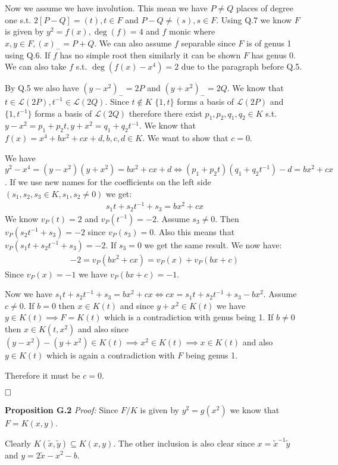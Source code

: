 \documentclass[12pt, a4paper]{article}
\newcommand{\qed}{\hfill\square}
\begin{document}
Now we assume we have involution. This mean we have $P \neq Q$ places of degree one s.t. $2[P-Q]=(t), t \in F$ and $P-Q \neq (s), s \in F$. Using Q.7 we know $F$ is given by $y^2 = f(x), \deg(f)=4$ and $f$ monic where $x,y \in F, (x)_{-} = P+Q$. We can also assume $f$ separable since $F$ is of genus 1 using Q.6. If $f$ has no simple root then similarly it can be shown $F$ has genus 0. We can also take $f$ s.t. $\deg(f(x)-x^4)=2$ due to the paragraph before Q.5.

By Q.5 we also have $(y-x^2)_{-} = 2P$ and $(y+x^2)_{-} = 2Q$. We know that $t \in \mathcal{L}(2P), t^{-1} \in \mathcal{L}(2Q)$. Since $t \notin K$ $\{1,t\}$ forms a basis of $\mathcal{L}(2P)$ and $\{1,t^{-1}\}$ forms a basis of $\mathcal{L}(2Q)$ therefore there exist $p_1, p_2, q_1, q_2 \in K$ s.t. $y-x^2 = p_1+p_2t, y+x^2=q_1+q_2t^{-1}$. We know that $f(x)=x^4+bx^2+cx+d, b,c,d \in K$. We want to show that $c=0$. 

We have $y^2-x^4=(y-x^2)(y+x^2)=bx^2+cx+d \iff (p_1+p_2t)(q_1+q_2t^{-1})-d = bx^2+cx$. If we use new names for the coefficients on the left side $(s_1,s_2,s_3 \in K, s_1,s_2 \neq 0)$
 we get:
\begin{gather*}
s_1t+s_2t^{-1}+s_3 = bx^2+cx
\end{gather*}
We know $v_P(t)=2$ and $v_P(t^{-1})=-2$. Assume $s_3 \neq 0$. Then $v_P(s_2t^{-1}+s_3) = -2$ since $v_P(s_3) = 0$. Also this means that $v_P(s_1t+s_2t^{-1}+s_3)=-2$. If $s_3=0$ we get the same result. We now have:
\begin{gather*}
-2=v_P(bx^2+cx) = v_P(x)+v_P(bx+c)
\end{gather*}
Since $v_P(x)=-1$ we have $v_P(bx+c) = -1$.

Now we have $s_1t+s_2t^{-1}+s_3 = bx^2+cx \iff cx = s_1t+s_2t^{-1}+s_3-bx^2$. Assume $c \neq 0$. If $b=0$ then $x \in K(t)$ and since $y+x^2 \in K(t)$ we have $y \in K(t) \implies F=K(t)$ which is a contradiction with genus being 1. If $b \neq 0$ then $x \in K(t,x^2)$ and also since $(y-x^2)-(y+x^2) \in K(t) \implies x^2 \in K(t) \implies x \in K(t)$ and also $y \in K(t)$ which is again a contradiction with $F$ being genus 1.

Therefore it must be $c=0$.

$\qed$

\textbf{Proposition G.2} \textit{Proof:}
Since $F/K$ is given by $y^2 = g(x^2)$ we know that $F=K(x,y)$.

Clearly $K(\tilde{x},\tilde{y}) \subseteq K(x,y)$. The other inclusion is also clear since $x = \tilde{x}^{-1}\tilde{y}$ and $y = 2\tilde{x}-x^2-b$. 
\end{document}
